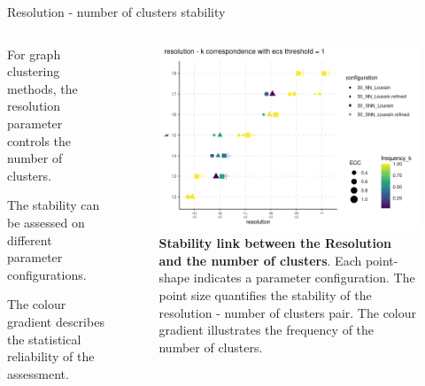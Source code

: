 \begin{frame}{Resolution - number of clusters stability}
    \begin{columns}
        \begin{column}{0.45\textwidth}
            \justifying

            For graph clustering methods, the resolution parameter controls the number of clusters.
            \bigskip


            The stability can be assessed on different parameter configurations.
            \bigskip

            The colour gradient describes the statistical reliability of the assessment.


        \end{column}

        \begin{column}{0.5\textwidth}
            \begin{figure}
                \centering
                \includegraphics[width=\textwidth]{images/ch3/3_1_kres_ecc.png}
                \caption{\justifying \textbf{Stability link between the Resolution and the number of clusters}. Each point-shape indicates a parameter configuration. The point size quantifies the stability of the resolution - number of clusters pair. The colour gradient illustrates the frequency of the number of clusters.}
            \end{figure}
        \end{column}
    \end{columns}
\end{frame}